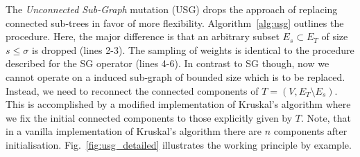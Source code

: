 \documentclass[twoside]{article}
\begin{document}
The \emph{Unconnected Sub-Graph} mutation (USG) drops the approach of replacing connected sub-trees in favor of more flexibility. Algorithm~\ref{alg:usg} outlines the procedure. Here, the major difference is that an arbitrary subset $E_s \subset E_T$ of size $s \leq \sigma$ is dropped (lines 2-3). The sampling of weights is identical to the procedure described for the SG operator (lines 4-6). In contrast to SG though, now we cannot operate on a induced sub-graph of bounded size which is to be replaced. Instead, we need to reconnect the connected components of $T = (V, E_T \setminus E_s)$. This is accomplished by a modified implementation of Kruskal's algorithm where we fix the initial connected components to those explicitly given by $T$. Note, that in a vanilla implementation of Kruskal's algorithm there are $n$ components after initialisation. Fig.~\ref{fig:usg_detailed} illustrates the working principle by example.
\end{document}
